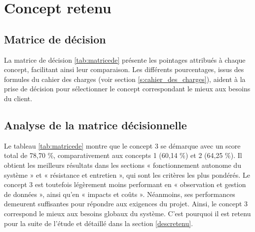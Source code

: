 %
%

\chapter{Concept retenu}
\label{s:concept_retenu}
\section{Matrice de décision}
La matrice de décision \ref{tab:matricede} présente les pointages attribués à chaque concept, facilitant ainsi leur comparaison.
Les différents pourcentages, issus des formules du cahier des charges (voir section \ref{s:cahier_des_charges}), 
aident à la prise de décision pour sélectionner le concept correspondant le mieux aux besoins du client.

\section{Analyse de la matrice décisionnelle}
Le tableau \ref{tab:matricede} montre que le concept 3 se démarque avec un score total de 78,70 \%, comparativement aux concepts 1 (60,14 \%) et 2 (64,25 \%). Il obtient les meilleurs résultats dans les sections « fonctionnement autonome du système » et « résistance et entretien », qui sont les critères les plus pondérés.
Le concept 3 est toutefois légèrement moins performant en « observation et gestion de données », ainsi qu’en « impacts et coûts ». Néanmoins, ses performances demeurent suffisantes pour répondre aux exigences du projet.
Ainsi, le concept 3 correspond le mieux aux besoins globaux du système. C’est pourquoi il est retenu pour la suite de l’étude et détaillé dans la section \ref{descretenu}.



